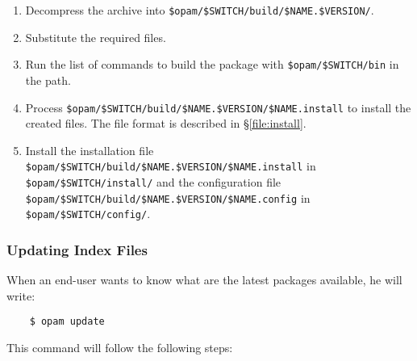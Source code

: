 \documentclass[a4paper,10pt]{article}
\begin{document}
\begin{enumerate}
\begin{enumerate}
\item Decompress the archive into \verb+$opam/$SWITCH/build/$NAME.$VERSION/+.

\item Substitute the required files.

\item Run the list of commands to build the package with \verb+$opam/$SWITCH/bin+
  in the path.

\item Process \verb+$opam/$SWITCH/build/$NAME.$VERSION/$NAME.install+ to install
  the created files. The file format is described in \S\ref{file:install}.

\item Install the installation file
  \verb+$opam/$SWITCH/build/$NAME.$VERSION/$NAME.install+ in
  \verb+$opam/$SWITCH/install/+ and the configuration file
  \verb+$opam/$SWITCH/build/$NAME.$VERSION/$NAME.config+ in
  \verb+$opam/$SWITCH/config/+.

\end{enumerate}
\end{enumerate}

\subsubsection{Updating Index Files}
\label{opam-update}

When an end-user wants to know what are the latest packages available,
he will write:

\begin{verbatim}
    $ opam update
\end{verbatim}

This command will follow the following steps:
\end{document}
